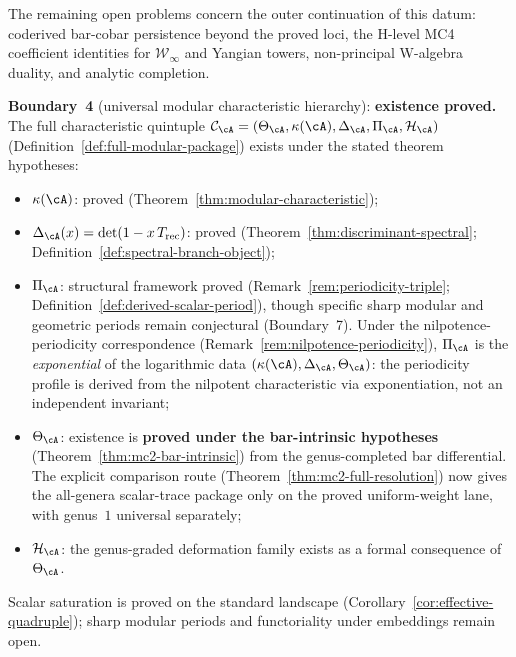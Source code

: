 \begin{remark}
\label{rem:volume-one-concrete-modular-datum-frontier}
The remaining open problems concern the outer continuation of this datum: coderived
bar-cobar persistence beyond the proved loci, the H-level MC4 coefficient identities for
$\mathcal{W}_\infty$ and Yangian towers, non-principal W-algebra duality, and analytic completion.
\end{remark}

\noindent\textbf{Boundary~4} (universal modular characteristic hierarchy):
\textbf{existence proved.}
The full characteristic quintuple
$\mathcal{C}_{\cA} = (\Theta_{\cA}, \kappa(\cA), \Delta_{\cA},
\Pi_{\cA}, \mathcal{H}_{\cA})$
(Definition~\ref{def:full-modular-package}) exists under the stated
theorem hypotheses:

\begin{itemize}[nosep]
\item $\kappa(\cA)$: proved (Theorem~\ref{thm:modular-characteristic});
\item $\Delta_{\cA}(x) = \det(1 - x\,T_{\mathrm{rec}})$: proved
 (Theorem~\ref{thm:discriminant-spectral};
 Definition~\ref{def:spectral-branch-object});
\item $\Pi_{\cA}$: structural framework proved
 (Remark~\ref{rem:periodicity-triple};
 Definition~\ref{def:derived-scalar-period}), though
 specific sharp modular and geometric periods remain conjectural
 (Boundary~7). Under the nilpotence-periodicity correspondence
 (Remark~\ref{rem:nilpotence-periodicity}), $\Pi_{\cA}$ is the
 \emph{exponential} of the logarithmic data
 $(\kappa(\cA), \Delta_{\cA}, \Theta_{\cA})$: the periodicity
 profile is derived from the nilpotent characteristic via
 exponentiation, not an independent invariant;
\item $\Theta_{\cA}$: existence is \textbf{proved under the
 bar-intrinsic hypotheses}
 (Theorem~\ref{thm:mc2-bar-intrinsic}) from the genus-completed
 bar differential. The explicit comparison route
 (Theorem~\ref{thm:mc2-full-resolution}) now gives the
 all-genera scalar-trace package only on the proved
 uniform-weight lane, with genus~$1$ universal separately;
\item $\mathcal{H}_{\cA}$: the genus-graded deformation family
 exists as a formal consequence of $\Theta_{\cA}$.
\end{itemize}

Scalar saturation is proved on the standard landscape
(Corollary~\ref{cor:effective-quadruple}); sharp modular periods
and functoriality under embeddings remain open.


